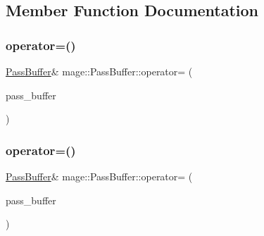 \subsection{Member Function Documentation}
\hypertarget{structmage_1_1_pass_buffer_a8d0cc48dea7dfb6b710b6162b3a82b7e}{}\label{structmage_1_1_pass_buffer_a8d0cc48dea7dfb6b710b6162b3a82b7e} 
\subsubsection{\texorpdfstring{operator=()}{operator=()}\hspace{0.1cm}{\footnotesize\ttfamily [1/2]}}
{\footnotesize\ttfamily \hyperlink{structmage_1_1_pass_buffer}{Pass\+Buffer}\& mage\+::\+Pass\+Buffer\+::operator= (\begin{DoxyParamCaption}\item[{const \hyperlink{structmage_1_1_pass_buffer}{Pass\+Buffer} \&}]{pass\+\_\+buffer }\end{DoxyParamCaption})\hspace{0.3cm}{\ttfamily [delete]}}

\hypertarget{structmage_1_1_pass_buffer_a8a5832066c415bea077107c7a9d18df5}{}\label{structmage_1_1_pass_buffer_a8a5832066c415bea077107c7a9d18df5} 
\subsubsection{\texorpdfstring{operator=()}{operator=()}\hspace{0.1cm}{\footnotesize\ttfamily [2/2]}}
{\footnotesize\ttfamily \hyperlink{structmage_1_1_pass_buffer}{Pass\+Buffer}\& mage\+::\+Pass\+Buffer\+::operator= (\begin{DoxyParamCaption}\item[{\hyperlink{structmage_1_1_pass_buffer}{Pass\+Buffer} \&\&}]{pass\+\_\+buffer }\end{DoxyParamCaption})\hspace{0.3cm}{\ttfamily [delete]}}

\hypertarget{structmage_1_1_pass_buffer_a6b73eb28fac15b121ff013b03ab643f8}{}\label{structmage_1_1_pass_buffer_a6b73eb28fac15b121ff013b03ab643f8} 
